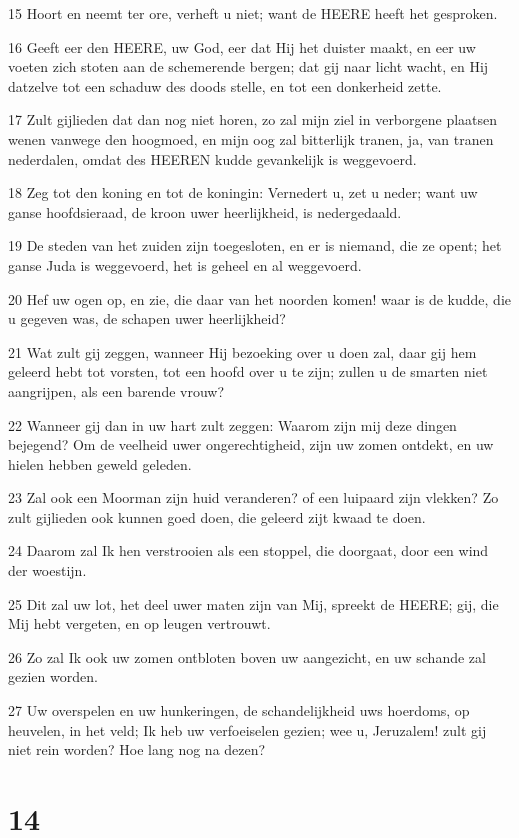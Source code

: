 \par 15 Hoort en neemt ter ore, verheft u niet; want de HEERE heeft het gesproken.
\par 16 Geeft eer den HEERE, uw God, eer dat Hij het duister maakt, en eer uw voeten zich stoten aan de schemerende bergen; dat gij naar licht wacht, en Hij datzelve tot een schaduw des doods stelle, en tot een donkerheid zette.
\par 17 Zult gijlieden dat dan nog niet horen, zo zal mijn ziel in verborgene plaatsen wenen vanwege den hoogmoed, en mijn oog zal bitterlijk tranen, ja, van tranen nederdalen, omdat des HEEREN kudde gevankelijk is weggevoerd.
\par 18 Zeg tot den koning en tot de koningin: Vernedert u, zet u neder; want uw ganse hoofdsieraad, de kroon uwer heerlijkheid, is nedergedaald.
\par 19 De steden van het zuiden zijn toegesloten, en er is niemand, die ze opent; het ganse Juda is weggevoerd, het is geheel en al weggevoerd.
\par 20 Hef uw ogen op, en zie, die daar van het noorden komen! waar is de kudde, die u gegeven was, de schapen uwer heerlijkheid?
\par 21 Wat zult gij zeggen, wanneer Hij bezoeking over u doen zal, daar gij hem geleerd hebt tot vorsten, tot een hoofd over u te zijn; zullen u de smarten niet aangrijpen, als een barende vrouw?
\par 22 Wanneer gij dan in uw hart zult zeggen: Waarom zijn mij deze dingen bejegend? Om de veelheid uwer ongerechtigheid, zijn uw zomen ontdekt, en uw hielen hebben geweld geleden.
\par 23 Zal ook een Moorman zijn huid veranderen? of een luipaard zijn vlekken? Zo zult gijlieden ook kunnen goed doen, die geleerd zijt kwaad te doen.
\par 24 Daarom zal Ik hen verstrooien als een stoppel, die doorgaat, door een wind der woestijn.
\par 25 Dit zal uw lot, het deel uwer maten zijn van Mij, spreekt de HEERE; gij, die Mij hebt vergeten, en op leugen vertrouwt.
\par 26 Zo zal Ik ook uw zomen ontbloten boven uw aangezicht, en uw schande zal gezien worden.
\par 27 Uw overspelen en uw hunkeringen, de schandelijkheid uws hoerdoms, op heuvelen, in het veld; Ik heb uw verfoeiselen gezien; wee u, Jeruzalem! zult gij niet rein worden? Hoe lang nog na dezen?

\chapter{14}

